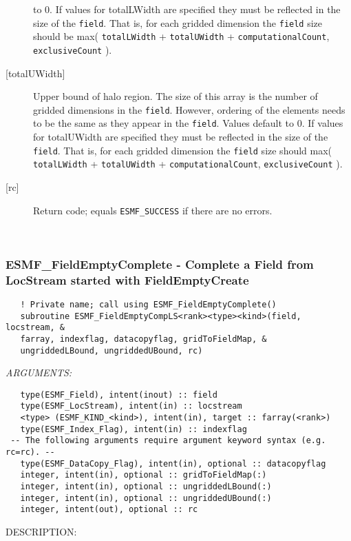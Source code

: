 \begin{description}
   to 0. If values for totalLWidth are specified they must be reflected in 
   the size of the {\tt field}. That is, for each gridded dimension the 
   {\tt field} size should be max( {\tt totalLWidth} + {\tt totalUWidth} 
   + {\tt computationalCount}, {\tt exclusiveCount} ). 
   \item [{[totalUWidth]}] 
   Upper bound of halo region. The size of this array is the number 
   of gridded dimensions in the {\tt field}. However, ordering of the elements 
   needs to be the same as they appear in the {\tt field}. Values default 
   to 0. If values for totalUWidth are specified they must be reflected in 
   the size of the {\tt field}. That is, for each gridded dimension the 
   {\tt field} size should max( {\tt totalLWidth} + {\tt totalUWidth} 
   + {\tt computationalCount}, {\tt exclusiveCount} ). 
   \item [{[rc]}] 
   Return code; equals {\tt ESMF\_SUCCESS} if there are no errors. 
   \end{description} 
    
 
\mbox{}\hrulefill\ 
 
\subsubsection [ESMF\_FieldEmptyComplete] {ESMF\_FieldEmptyComplete - Complete a Field from LocStream started with FieldEmptyCreate }


   
\begin{verbatim}   ! Private name; call using ESMF_FieldEmptyComplete() 
   subroutine ESMF_FieldEmptyCompLS<rank><type><kind>(field, locstream, & 
   farray, indexflag, datacopyflag, gridToFieldMap, & 
   ungriddedLBound, ungriddedUBound, rc) 
   \end{verbatim}{\em ARGUMENTS:}
\begin{verbatim}   type(ESMF_Field), intent(inout) :: field 
   type(ESMF_LocStream), intent(in) :: locstream 
   <type> (ESMF_KIND_<kind>), intent(in), target :: farray(<rank>) 
   type(ESMF_Index_Flag), intent(in) :: indexflag 
 -- The following arguments require argument keyword syntax (e.g. rc=rc). --
   type(ESMF_DataCopy_Flag), intent(in), optional :: datacopyflag 
   integer, intent(in), optional :: gridToFieldMap(:) 
   integer, intent(in), optional :: ungriddedLBound(:) 
   integer, intent(in), optional :: ungriddedUBound(:) 
   integer, intent(out), optional :: rc 
   \end{verbatim}
{\sf DESCRIPTION:\\ }

